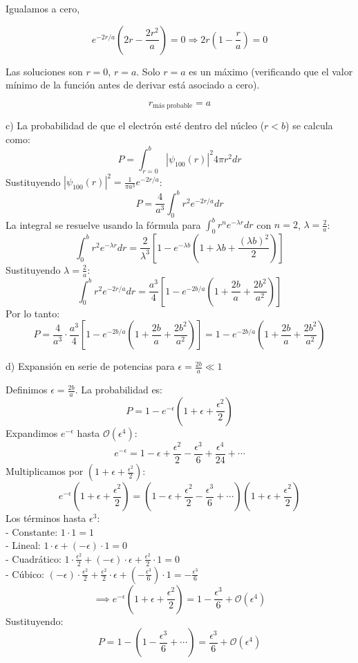 \documentclass{article}
\theoremstyle{nonumberplain}
\begin{document}
Igualamos a cero,

$$
e^{-2r/a} \left( 2r - \frac{2r^2}{a} \right) = 0 \Rightarrow 2r \left(1 - \frac{r}{a} \right) = 0
$$

Las soluciones son $r = 0$, $r = a$. Solo $r = a$ es un máximo (verificando que el valor mínimo de la función antes de derivar está asociado a cero).

$$
r_{\text{más probable}} = a
$$

c) La probabilidad de que el electrón esté dentro del núcleo (\( r < b \)) se calcula como:
\[
P = \int_{r=0}^{b} |\psi_{100}(r)|^2  4\pi r^2  dr
\]
Sustituyendo \( |\psi_{100}(r)|^2 = \frac{1}{\pi a^3} e^{-2r/a} \):
\[
P = \frac{4}{a^3} \int_0^b r^2 e^{-2r/a}  dr
\]
La integral se resuelve usando la fórmula para \( \int_0^b r^n e^{-\lambda r}  dr \) con \( n=2 \), \( \lambda = \frac{2}{a} \):
\[
\int_0^b r^2 e^{-\lambda r}  dr = \frac{2}{\lambda^3} \left[ 1 - e^{-\lambda b} \left( 1 + \lambda b + \frac{(\lambda b)^2}{2} \right) \right]
\]
Sustituyendo \( \lambda = \frac{2}{a} \):
\[
\int_0^b r^2 e^{-2r/a}  dr = \frac{a^3}{4} \left[ 1 - e^{-2b/a} \left( 1 + \frac{2b}{a} + \frac{2b^2}{a^2} \right) \right]
\]
Por lo tanto:
\[
P = \frac{4}{a^3} \cdot \frac{a^3}{4} \left[ 1 - e^{-2b/a} \left( 1 + \frac{2b}{a} + \frac{2b^2}{a^2} \right) \right] = 1 - e^{-2b/a} \left( 1 + \frac{2b}{a} + \frac{2b^2}{a^2} \right)
\]

d) Expansión en serie de potencias para \( \epsilon = \frac{2b}{a} \ll 1 \)

   Definimos \( \epsilon = \frac{2b}{a} \). La probabilidad es:
   \[
   P = 1 - e^{-\epsilon} \left( 1 + \epsilon + \frac{\epsilon^2}{2} \right)
   \]
   Expandimos \( e^{-\epsilon} \) hasta \( \mathcal{O}(\epsilon^4) \):
   \[
   e^{-\epsilon} = 1 - \epsilon + \frac{\epsilon^2}{2} - \frac{\epsilon^3}{6} + \frac{\epsilon^4}{24} + \cdots
   \]
   Multiplicamos por \( \left( 1 + \epsilon + \frac{\epsilon^2}{2} \right) \):
   \[
   e^{-\epsilon} \left( 1 + \epsilon + \frac{\epsilon^2}{2} \right) = \left(1 - \epsilon + \frac{\epsilon^2}{2} - \frac{\epsilon^3}{6} + \cdots \right) \left(1 + \epsilon + \frac{\epsilon^2}{2} \right)
   \]
   Los términos hasta \( \epsilon^3 \): \\
   - Constante: \( 1 \cdot 1 = 1 \) \\
   - Lineal: \( 1 \cdot \epsilon + (-\epsilon) \cdot 1 = 0 \) \\
   - Cuadrático: \( 1 \cdot \frac{\epsilon^2}{2} + (-\epsilon) \cdot \epsilon + \frac{\epsilon^2}{2} \cdot 1 = 0 \) \\
   - Cúbico: \( (-\epsilon) \cdot \frac{\epsilon^2}{2} + \frac{\epsilon^2}{2} \cdot \epsilon + \left(-\frac{\epsilon^3}{6}\right) \cdot 1 = -\frac{\epsilon^3}{6} \) 
   \[
   \implies e^{-\epsilon} \left( 1 + \epsilon + \frac{\epsilon^2}{2} \right) = 1 - \frac{\epsilon^3}{6} + \mathcal{O}(\epsilon^4)
   \]
   Sustituyendo:
   \[
   P = 1 - \left( 1 - \frac{\epsilon^3}{6} + \cdots \right) = \dfrac{\epsilon^3}{6} + \mathcal{O}(\epsilon^4)
   \]
  
\end{document}
